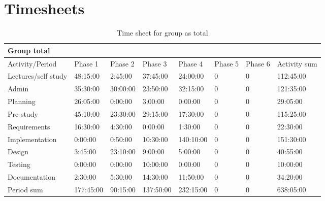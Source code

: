 \documentclass[11pt]{book}
\begin{document}
\chapter{Timesheets}
\begin{table}[H]
\centering
\begin{tabular}{| l | l | l | l | l | l | l | l |}
    \hline
    Group total         &             &             &             &             &             &             &                 \\ \hline                        
    Activity/Period     & Phase 1     & Phase 2     & Phase  3    & Phase 4     & Phase 5     & Phase 6     & Activity sum    \\ \hline
    Lectures/self study & 48:15:00    & 2:45:00     & 37:45:00    & 24:00:00    & 0           & 0           & 112:45:00       \\ \hline
    Admin               & 35:30:00    & 30:00:00    & 23:50:00    & 32:15:00    & 0           & 0           & 121:35:00       \\ \hline
    Planning            & 26:05:00    & 0:00:00     & 3:00:00     & 0:00:00     & 0           & 0           & 29:05:00        \\ \hline
    Pre-study           & 45:10:00    & 23:30:00    & 29:15:00    & 17:30:00    & 0           & 0           & 115:25:00       \\ \hline
    Requirements        & 16:30:00    & 4:30:00     & 0:00:00     & 1:30:00     & 0           & 0           & 22:30:00        \\ \hline
    Implementation      & 0:00:00     & 0:50:00     & 10:30:00    & 140:10:00   & 0           & 0           & 151:30:00       \\ \hline
    Design              & 3:45:00     & 23:10:00    & 9:00:00     & 5:00:00     & 0           & 0           & 40:55:00        \\ \hline
    Testing             & 0:00:00     & 0:00:00     & 10:00:00    & 0:00:00     & 0           & 0           & 10:00:00        \\ \hline
    Documentation       & 2:30:00     & 5:30:00     & 14:30:00    & 11:50:00    & 0           & 0           & 34:20:00        \\ \hline
    Period sum          & 177:45:00   & 90:15:00    & 137:50:00   & 232:15:00   & 0           & 0           & 638:05:00       \\ \hline
\end{tabular}
\caption{Time sheet for group as total}
\label{tab:appendix_timesheets_group}
\end{table}
\end{document}
